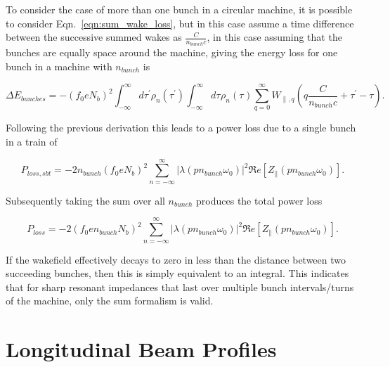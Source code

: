 \documentclass[12pt,a4paper,twopage,openright]{report}
\begin{document}
To consider the case of more than one bunch in a circular machine, it is possible to consider Eqn.~\ref{eqn:sum_wake_loss}, but in this case assume a time difference between the successive summed wakes as $\frac{C}{n_{bunch}c}$, in this case assuming that the bunches are equally space around the machine, giving the energy loss for one bunch in a machine with $n_{bunch}$ is 

\begin{equation}
\Delta E_{bunches} = - \left( f_{0} e  N_{b}\right)^{2} \int^{\infty}_{-\infty} d\tau^{'} \rho_{n} \left( \tau^{'} \right) \int^{\infty}_{-\infty} d\tau^{} \rho_{n} \left( \tau^{} \right) \displaystyle\sum\limits_{q = 0}^{\infty} W_{\parallel, q} \left( q\frac{C}{n_{bunch}c} + \tau^{'} - \tau \right).  
\label{eqn:sum_wake_loss_bunches}
\end{equation}

Following the previous derivation this leads to a power loss due to a single bunch in a train of 

\begin{equation}
P_{loss, sbt} = - 2 n_{bunch} \left( f_{0} e  N_{b} \right) ^{2} \displaystyle\sum\limits_{n = -\infty}^{\infty}  \left| \lambda \left( p n_{bunch} \omega_{0} \right)  \right|^{2} \Re{}e \left[ Z_{\parallel} \left( p n_{bunch}\omega_{0} \right) \right].
\label{eqn:power_loss_train_single_bunch}
\end{equation}

Subsequently taking the sum over all $n_{bunch}$ produces the total power loss 

\begin{equation}
P_{loss} = - 2 \left( f_{0} e n_{bunch}  N_{b}\right)^{2} \displaystyle\sum\limits_{n = -\infty}^{\infty}  \left| \lambda \left( p n_{bunch} \omega_{0} \right)  \right|^{2} \Re{}e \left[ Z_{\parallel} \left( p n_{bunch}\omega_{0} \right) \right].
\label{eqn:heating-gen}
\end{equation}

If the wakefield effectively decays to zero in less than the distance between two succeeding bunches, then this is simply equivalent to an integral. This indicates that for sharp resonant impedances that last over multiple bunch intervals/turns of the machine, only the sum formalism is valid.

\section{Longitudinal Beam Profiles}
\end{document}

